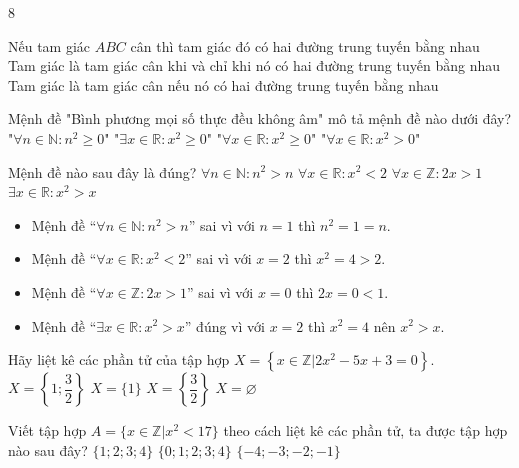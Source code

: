 \begin{indapan}{8}
\begin{ex}
	{\True Nếu tam giác $ABC$ cân thì tam giác đó có hai đường trung tuyến bằng nhau }
	{Tam giác là tam giác cân khi và chỉ khi nó có hai đường trung tuyến bằng nhau}
	{Tam giác là tam giác cân nếu nó có hai đường trung tuyến bằng nhau}
\end{ex}
\begin{ex}%
	Mệnh đề "Bình phương mọi số thực đều không âm" mô tả mệnh đề nào dưới đây?
	\choice
	{"$\forall n\in\mathbb{N}: n^2\geq 0$"}
	{"$\exists x\in\mathbb{R}:x^2\geq 0$"}
	{\True "$\forall x\in\mathbb{R}: x^2\geq 0$"}
	{"$\forall x\in\mathbb{R}:x^2>0$"}
\end{ex}
\begin{ex}%
	Mệnh đề nào sau đây là đúng?
	\choice
	{$\forall n\in\mathbb{N}\colon n^2>n$}
	{$\forall x\in\mathbb{R}\colon x^2<2$}
	{$\forall x\in\mathbb{Z}\colon 2x>1$}
	{\True $\exists x\in\mathbb{R}\colon x^2>x$}
	\loigiai
	{
		\begin{itemize}
			\item Mệnh đề ``$\forall n\in\mathbb{N}\colon n^2>n$'' sai vì với $n=1$ thì $n^2=1=n$.
			\item Mệnh đề ``$\forall x\in\mathbb{R}\colon x^2<2$'' sai vì với $x=2$ thì $x^2=4>2$.
			\item Mệnh đề ``$\forall x\in\mathbb{Z}\colon 2x>1$'' sai vì với $x=0$ thì $2x=0<1$.
			\item Mệnh đề ``$\exists x\in\mathbb{R}\colon x^2>x$'' đúng vì với $x=2$ thì $x^2=4$ nên $x^2>x$.
		\end{itemize}
	}
\end{ex}
\begin{ex}%
	Hãy liệt kê các phần tử của tập hợp $X = \left\{ x \in \mathbb{Z} | 2x^2-5x+3=0 \right\}$.
	\choice
	{$X = \left\{1;\dfrac{3}{2} \right\}$}
	{\True $X = \{ 1 \}$}
	{$X = \left\{ \dfrac{3}{2} \right\}$}
	{$X = \varnothing$}
\end{ex}
\begin{ex}%
	Viết tập hợp $A=\lbrace x \in \mathbb{Z}|x^2<17 \rbrace $ theo cách liệt kê các phần tử, ta được tập hợp nào sau đây?
	{$ \lbrace 1;2;3;4 \rbrace $}
	{$\lbrace 0;1;2;3;4  \rbrace $}
	{$ \lbrace -4; -3;-2;-1 \rbrace $}
\end{ex}


\end{indapan}
